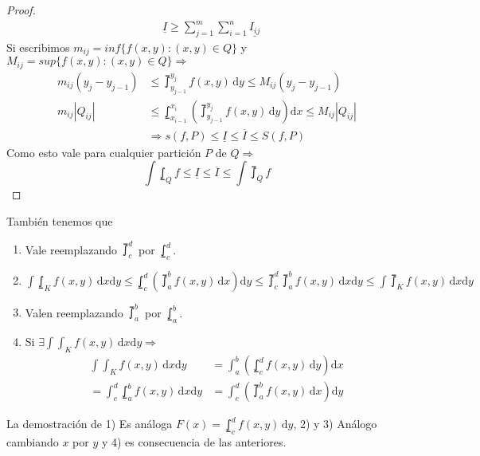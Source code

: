 \begin{theorem}
\begin{proof}
\begin{align*}
                                                              & \underline{I} \geq \sum_{j = 1}^m \sum_{i = 1}^n \underline{I_{ij}}
    \end{align*}
    Si escribimos $m_{ij} = inf\{ f(x, y) : (x, y) \in Q \}$ y $M_{ij} = sup\{ f(x, y) : (x, y) \in Q\} \Rightarrow$ \begin{align*}
      m_{ij} (y_j - y_{j-1}) & \leq \upint_{y_{j-1}}^{y_j} f(x, y)\, \mathrm{d} y \leq M_{ij} (y_j - y_{j-1})                                \\
      m_{ij} |Q_{ij}|        & \leq \lowint_{x_{i-1}}^{x_i} ( \upint_{y_{j-1}}^{y_j} f(x, y)\, \mathrm{d}y )\mathrm{d}x \leq M_{ij} |Q_{ij}| \\
                             & \Rightarrow s(f, P) \leq \underline{I} \leq \overline{I} \leq S(f, P)
    \end{align*}
    Como esto vale para cualquier partición $P$ de $Q \Rightarrow$ \begin{equation}
      \int\lowint_Q f \leq \underline{I} \leq \overline{I} \leq \int\upint_Q f
    \end{equation}
  \end{proof}
\end{theorem}

\clearpage

\begin{note}
  También tenemos que

  \begin{enumerate}
    \item Vale reemplazando $\upint_c^d$ por $\lowint_c^d$.
    \item $ \int \lowint_K f(x, y) \, \mathrm{d}x \mathrm{d}y \leq \lowint_c^d ( \upint_a^b f(x, y)\, \mathrm{d}x ) \mathrm{d}y \leq \upint_c^d \upint_a^b f(x, y) \, \mathrm{d}x \mathrm{d}y \leq \int \upint_K f(x, y) \, \mathrm{d}x \mathrm{d}y $
    \item Valen reemplazando $\upint_a^b$ por $\lowint_a^b$.
    \item Si $\exists \int \int_K f(x, y) \, \mathrm{d}x \mathrm{d}y \Rightarrow$ \begin{align*}
            \int \int_K f(x, y) \, \mathrm{d}x \mathrm{d}y & = \int_a^b(\lowint_c^d f(x, y) \, \mathrm{d}y)\mathrm{d}x \\ 
             = \int_c^d \lowint_a^b f(x, y) \, \mathrm{d}x \mathrm{d}y & = \int_c^d(\upint_a^b f(x,y) \, \mathrm{d}x)\mathrm{d}y
    \end{align*}
  \end{enumerate}

  La demostración de 1) Es análoga $F(x) = \lowint_c^d f(x, y) \, \mathrm{d}y$, 2) y 3) Análogo cambiando $x$ por $y$ y 4) es consecuencia de las anteriores.
\end{note}

